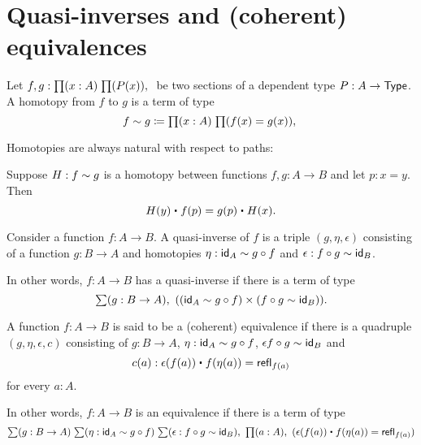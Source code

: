\section{Quasi-inverses and (coherent) equivalences}

\begin{defn}
Let $f,g:\prd{x:A}{P(x)}$ be two sections of a dependent type $P:A\to\type$. A
homotopy from $f$ to $g$ is a term of type
\begin{equation*}
f\htpy g\defeq \prd{x:A}{f(x)=g(x)}
\end{equation*}
\end{defn}

Homotopies are always natural with respect to paths:

\begin{lem}
Suppose $H:f\htpy g$ is a homotopy between functions $f,g:A\to B$
 and let $p:x=y$. Then
 \begin{equation*}
 H(y)\ct\ap{f}{p}=\ap{g}{p}\ct H(x).
 \end{equation*}
\end{lem}

\begin{defn}
Consider a function $f:A\to B$. A quasi-inverse of $f$ is a triple 
$(g,\eta,\epsilon)$ consisting of a function $g:B\to A$ and homotopies
$\eta:\idfunc[A]\htpy g\circ f$ and $\epsilon:f\circ g\htpy \idfunc[B]$.
\end{defn}

\begin{rm}
In other words, $f:A\to B$ has a quasi-inverse if there is a term of type
\begin{equation*}
\sm{g:B\to A}((\idfunc[A]\htpy g\circ f)\times(f\circ g\htpy\idfunc[B])).
\end{equation*}
\end{rm}

\begin{defn}
A function $f:A\to B$ is said to be a (coherent) equivalence if there is a
quadruple $(g,\eta,\epsilon,c)$ consisting of $g:B\to A$, $\eta:\idfunc[A]\htpy
g\circ f$, $\epsilon f\circ g\htpy\idfunc[B]$ and
\begin{equation*}
c(a):\epsilon(f(a))\ct f(\eta(a))=\refl{f(a)}
\end{equation*}
for every $a:A$. 
\end{defn}

\begin{rm}
In other words, $f:A\to B$ is an equivalence if there is a term of type
\begin{equation*}
\sm{g:B\to A}{\eta:\idfunc[A]\htpy g\circ f}
{\epsilon:f\circ g\htpy \idfunc[B]}\prd{a:A}(\epsilon(f(a))\ct \ap{f}{\eta(a)}=
\refl{f(a)})
\end{equation*}
\end{rm}

